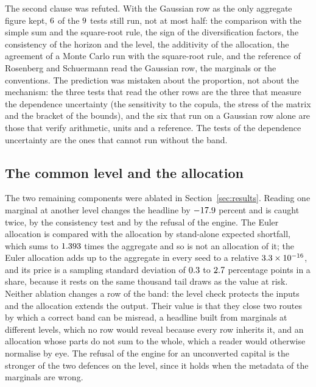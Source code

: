 

The second clause was refuted. With the Gaussian row as the only aggregate figure kept, $6$ of the
$9$ tests still run, not at most half: the comparison with the simple sum and the square-root rule, the sign of the
diversification factors, the consistency of the horizon and the level, the additivity of the allocation, the agreement of a
Monte Carlo run with the square-root rule, and the reference of Rosenberg and Schuermann read the Gaussian row, the marginals or
the conventions. The prediction was mistaken about the proportion, not about the mechanism: the three tests that read the other
rows are the three that measure the dependence uncertainty (the sensitivity to the copula, the stress of the matrix and the bracket
of the bounds), and the six that run on a Gaussian row alone are those that verify arithmetic, units and a reference. The tests of the
dependence uncertainty are the ones that cannot run without the band.

\subsection{The common level and the allocation}
\label{sec:ablation-level}

The two remaining components were ablated in Section~\ref{sec:results}. Reading one marginal at another level changes the headline by
$-17.9$ percent and is caught twice, by the consistency test and by the refusal of the engine. The Euler allocation is
compared with the allocation by stand-alone expected shortfall, which sums to $1.393$ times the aggregate and so is not
an allocation of it; the Euler allocation adds up to the aggregate in every seed to a relative $3.3\times 10^{-16}$, and its price is
a sampling standard deviation of $0.3$ to $2.7$ percentage points in a share, because it rests on the same thousand tail draws as the
value at risk. Neither ablation changes a row of the band: the level check protects the inputs and the allocation extends the
output. Their value is that they close two routes by which a correct band can be misread, a headline built from marginals at
different levels, which no row would reveal because every row inherits it, and an allocation whose parts do not sum to the whole,
which a reader would otherwise normalise by eye. The refusal of the engine for an unconverted capital is the stronger of the two
defences on the level, since it holds when the metadata of the marginals are wrong.
